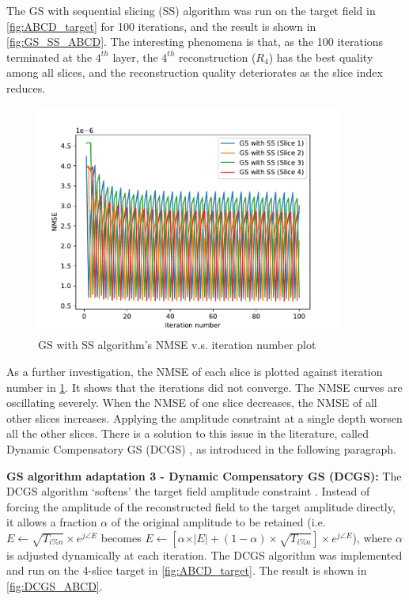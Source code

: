 The GS with sequential slicing (SS) algorithm was run on the target field in \cref{fig:ABCD_target} for 100 iterations, and the result is shown in \cref{fig:GS_SS_ABCD}. The interesting phenomena is that, as the 100 iterations terminated at the $4^{th}$ layer, the $4^{th}$ reconstruction ($R_4$) has the best quality among all slices, and the reconstruction quality deteriorates as the slice index reduces.

\begin{figure}[H]
  \centering
  \includegraphics[width=0.9\textwidth]{ABCD/Each_slice_GS.pdf}
  \caption{GS with SS algorithm's NMSE v.s. iteration number plot}
  \label{fig:Each_slice_GS}
\end{figure}

As a further investigation, the NMSE of each slice is plotted against iteration number in \cref{fig:Each_slice_GS}. It shows that the iterations did not converge. The NMSE curves are oscillating severely. When the NMSE of one slice decreases, the NMSE of all other slices increases. Applying the amplitude constraint at a single depth worsen all the other slices. There is a solution to this issue in the literature, called Dynamic Compensatory GS (DCGS) \cite{Zhou2019}, as introduced in the following paragraph.


\textbf{GS algorithm adaptation 3 - Dynamic Compensatory GS (DCGS): }
The DCGS algorithm `softens' the target field amplitude constraint \cite{Zhou2019}. Instead of forcing the amplitude of the reconstructed field to the target amplitude directly, it allows a fraction $\alpha$ of the original amplitude to be retained (i.e. $E \gets \sqrt{T_{i\%n}} \times e^{j\angle E}$ becomes $E \gets [\alpha \times \vert E \vert + (1-\alpha) \times \sqrt{T_{i\%n}}] \times e^{j\angle E}$), where $\alpha$ is adjusted dynamically at each iteration. The DCGS algorithm was implemented and run on the 4-slice target in \cref{fig:ABCD_target}. The result is shown in \cref{fig:DCGS_ABCD}.

